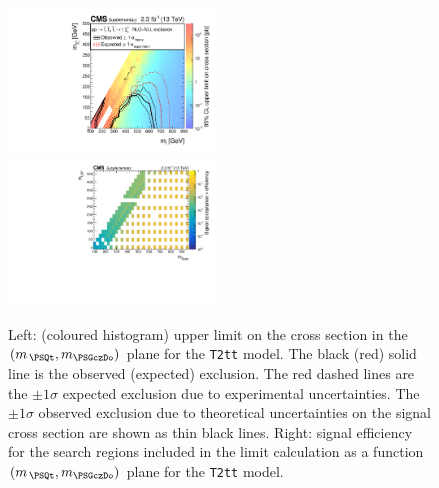 \begin{figure}[t]
  \begin{center}
    \includegraphics[width=0.49\textwidth]{GenMetXSEC_aux} \, %
    \includegraphics[width=0.49\textwidth]{T2tt_merging_4_cats_aux} \,     
  \end{center}
  \caption{Left: (coloured histogram) upper limit on the cross section in the $(m_{\,\PSQt}, m_{\PSGczDo})$ plane for the \texttt{T2tt} model. 
  The black (red) solid line is the observed (expected) exclusion. The red dashed lines are the $\pm1\sigma$ expected exclusion due to experimental uncertainties. 
  The $\pm1\sigma$ observed exclusion due to theoretical uncertainties on the signal cross section are shown as thin black lines. 
  Right: signal efficiency for the search regions included in the limit calculation as a function $(m_{\,\PSQt}, m_{\PSGczDo})$ plane for the \texttt{T2tt} model. 
  \label{fig:T2tt_excl}}
\end{figure}


